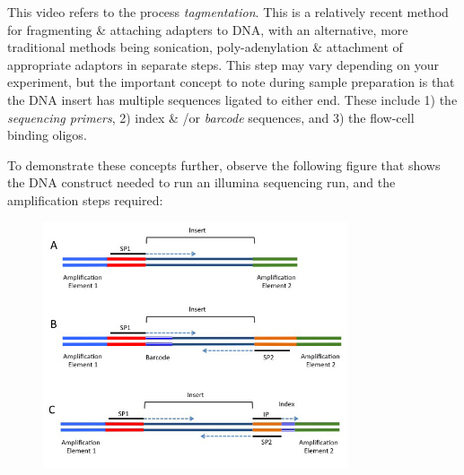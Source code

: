 \begin{note}
This video refers to the process \textit{tagmentation}.
This is a relatively recent method for fragmenting \& attaching adapters to DNA, with an alternative, more traditional methods being sonication, poly-adenylation \& attachment of appropriate adaptors in separate steps.
This step may vary depending on your experiment, but the important concept to note during sample preparation is that the DNA insert has multiple sequences ligated to either end.
These include 1) the \textit{sequencing primers}, 2) index \& /or \textit{barcode} sequences, and 3) the flow-cell binding oligos.

To demonstrate these concepts further, observe the following figure that shows the DNA construct needed to run an illumina sequencing run, and the amplification steps required:

\begin{figure}[h!]
  \centering
    \includegraphics[width=0.8\textwidth]{libprep.jpg}
\end{figure}
\end{note}

